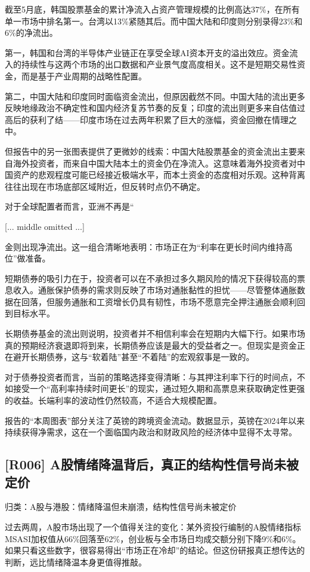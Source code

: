 \documentclass[11pt]{ctexart}
\begin{document}
截至5月底，韩国股票基金的累计净流入占资产管理规模的比例高达37\%，在所有单一市场中排名第一。台湾以13\%紧随其后。而中国大陆和印度则分别录得23\%和6\%的净流出。

第一，韩国和台湾的半导体产业链正在享受全球AI资本开支的溢出效应。资金流入的持续性与这两个市场的出口数据和产业景气度高度相关。这不是短期交易性资金，而是基于产业周期的战略性配置。

第二，中国大陆和印度同时面临资金流出，但原因截然不同。中国大陆的流出更多反映地缘政治不确定性和国内经济复苏节奏的反复；印度的流出则更多来自估值过高后的获利了结——印度市场在过去两年积累了巨大的涨幅，资金回撤在情理之中。

但报告中的另一张图表提供了更微妙的线索：中国大陆股票基金的资金流出主要来自海外投资者，而来自中国大陆本土的资金仍在净流入。这意味着海外投资者对中国资产的悲观程度可能已经接近极端水平，而本土资金的态度相对乐观。这种背离往往出现在市场底部区域附近，但反转时点仍不确定。

对于全球配置者而言，亚洲不再是“

[... middle omitted ...]

金则出现净流出。这一组合清晰地表明：市场正在为“利率在更长时间内维持高位”做准备。

短期债券的吸引力在于，投资者可以在不承担过多久期风险的情况下获得较高的票息收入。通胀保护债券的需求则反映了市场对通胀黏性的担忧——尽管整体通胀数据在回落，但服务通胀和工资增长仍具有韧性，市场不愿意完全押注通胀会顺利回到目标水平。

长期债券基金的流出则说明，投资者并不相信利率会在短期内大幅下行。如果市场真的预期经济衰退即将到来，长期债券应该是最大的受益者之一。但现实是资金正在避开长期债券，这与“软着陆”甚至“不着陆”的宏观叙事是一致的。

对于债券投资者而言，当前的策略选择变得清晰：与其押注利率下行的时间点，不如接受一个“高利率持续时间更长”的现实，通过短久期和高票息来获取确定性更强的收益。长端利率的波动性仍然较高，不适合大规模配置。

报告的“本周图表”部分关注了英镑的跨境资金流动。数据显示，英镑在2024年以来持续获得净需求，这在一个面临国内政治和财政风险的经济体中显得不太寻常。

\subsection{[R006] A股情绪降温背后，真正的结构性信号尚未被定价}
{\small\color{refgray}归类：A股与港股：情绪降温但未崩溃，结构性信号尚未被定价}

过去两周，A股市场出现了一个值得关注的变化：某外资投行编制的A股情绪指标MSASI加权值从66\%回落至62\%，创业板与全市场日均成交额分别下降9\%和6\%。如果只看这些数字，很容易得出“市场正在冷却”的结论。但这份研报真正想传达的判断，远比情绪降温本身更值得推敲。
\end{document}
